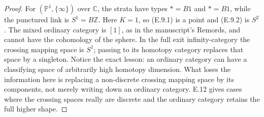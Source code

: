 \begin{proof}
For $(\mathbb P^1,\{\infty\})$ over $\mathbb C$, the strata have types $*=B1$ and $*=B1$, while the punctured link is $S^1=B\mathbb Z$. Here $K=1$, so (E.9.1) is a point and (E.9.2) is $S^2$. The mixed ordinary category is $[1]$, as in the manuscript's Remords, and cannot have the cohomology of the sphere. In the full exit infinity-category the crossing mapping space is $S^1$; passing to its homotopy category replaces that space by a singleton. Notice the exact lesson: an ordinary category can have a classifying space of arbitrarily high homotopy dimension. What loses the information here is replacing a non-discrete crossing mapping space by its components, not merely writing down an ordinary category. E.12 gives cases where the crossing spaces really are discrete and the ordinary category retains the full higher shape. 
\end{proof}


